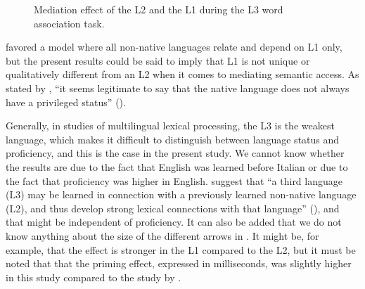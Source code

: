 \documentclass[output=paper,colorlinks,citecolor=brown,nonflat]{langsci/langscibook}
\begin{document}
\begin{figure}
    \caption{Mediation effect of the L2 and the L1 during the L3 word association task.}
    \label{fig:gudmundson:7}
\end{figure}

\citet{Abunuwara1992} favored a model where all non-native languages relate and depend on L1 only, but the present results could be said to imply that L1 is not unique or qualitatively different from an L2 when it comes to mediating semantic access. As stated by \citeauthor{Szubko-Sitarek2011}, “it seems legitimate to say that the native language does not always have a privileged status” (\citeyear[170]{Szubko-Sitarek2011}).

Generally, in studies of multilingual lexical processing, the L3 is the weakest language, which makes it difficult to distinguish between language status and proficiency, and this is the case in the present study. We cannot know whether the results are due to the fact that English was learned before Italian or due to the fact that proficiency was higher in English. \citeauthor{GoralEtAl2006} suggest that “a third language (L3) may be learned in connection with a previously learned non-native language (L2), and thus develop strong lexical connections with that language” (\citeyear[244]{GoralEtAl2006}), and that might be independent of proficiency. It can also be added that we do not know anything about the size of the different arrows in . It might be, for example, that the effect is stronger in the L1 compared to the L2, but it must be noted that that the priming effect, expressed in milliseconds, was slightly higher in this study compared to the study by \citet{FitzpatrickIzura2011}.
\end{document}
